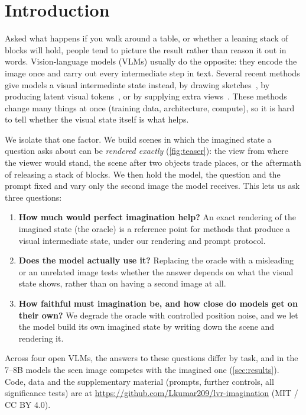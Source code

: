 \section{Introduction}
\label{sec:intro}

Asked what happens if you walk around a table, or whether a leaning stack of blocks will hold, people tend to picture the result rather than reason it out in words. Vision-language models (VLMs) usually do the opposite: they encode the image once and carry out every intermediate step in text. Several recent methods give models a visual intermediate state instead, by drawing sketches~\cite{hu2024sketchpad}, by producing latent visual tokens~\cite{yang2026mirage,li2025lvr}, or by supplying extra views~\cite{wang2026mindcube}. These methods change many things at once (training data, architecture, compute), so it is hard to tell whether the visual state itself is what helps.

We isolate that one factor. We build scenes in which the imagined state a question asks about can be \emph{rendered exactly} (\cref{fig:teaser}): the view from where the viewer would stand, the scene after two objects trade places, or the aftermath of releasing a stack of blocks. We then hold the model, the question and the prompt fixed and vary only the second image the model receives. This lets us ask three questions:
\begin{enumerate}[nosep,leftmargin=*]
  \item \textbf{How much would perfect imagination help?} An exact rendering of the imagined state (the oracle) is a reference point for methods that produce a visual intermediate state, under our rendering and prompt protocol.
  \item \textbf{Does the model actually use it?} Replacing the oracle with a misleading or an unrelated image tests whether the answer depends on what the visual state shows, rather than on having a second image at all.
  \item \textbf{How faithful must imagination be, and how close do models get on their own?} We degrade the oracle with controlled position noise, and we let the model build its own imagined state by writing down the scene and rendering it.
\end{enumerate}

Across four open VLMs, the answers to these questions differ by task, and in the 7--8B models the seen image competes with the imagined one (\cref{sec:results}). Code, data and the supplementary material (prompts, further controls, all significance tests) are at \url{https://github.com/Lkumar209/lvr-imagination} (MIT / CC BY 4.0).
